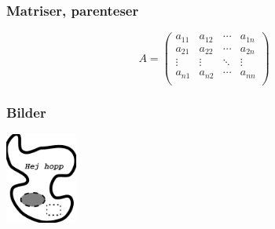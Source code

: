 \begin{frame}[fragile,t]
  \frametitle{Matriser, parenteser}
  \vspace{2em}

  \begin{exlatex}
\[
A=\left(
\begin{array}{cccc}
a_{11} & a_{12} & \cdots & a_{1n} \\
a_{21} & a_{22} & \cdots & a_{2n} \\
\vdots & \vdots & \ddots & \vdots \\
a_{n1} & a_{n2} & \cdots & a_{nn} \\
\end{array}
\right)
\]
  \end{exlatex}
\end{frame}


\begin{frame}[fragile,t]
  \frametitle{Bilder}
  \vspace{2em}



  \blankline

  \vspace{2mm}
  \begin{exlatex}
  \includegraphics[height=30mm]
    {images/bild.pdf}
  \end{exlatex}

\end{frame}

